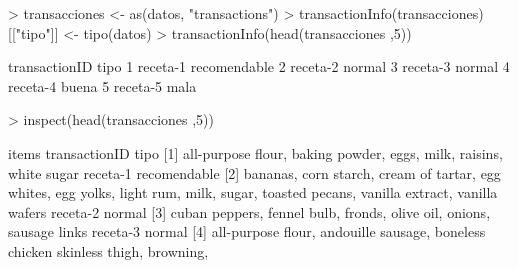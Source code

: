 \documentclass [a4paper] {article}
\begin{document}
\begin{Schunk}
\begin{Sinput}
> transacciones <- as(datos, "transactions")
> transactionInfo(transacciones)[["tipo"]] <- tipo(datos)
> transactionInfo(head(transacciones ,5))
\end{Sinput}
\begin{Soutput}
  transactionID         tipo
1      receta-1 recomendable
2      receta-2       normal
3      receta-3       normal
4      receta-4        buena
5      receta-5         mala
\end{Soutput}
\begin{Sinput}
> inspect(head(transacciones ,5))
\end{Sinput}
\begin{Soutput}
    items                             transactionID         tipo
[1] {all-purpose flour,                                         
     baking powder,                                             
     eggs,                                                      
     milk,                                                      
     raisins,                                                   
     white sugar}                          receta-1 recomendable
[2] {bananas,                                                   
     corn starch,                                               
     cream of tartar,                                           
     egg whites,                                                
     egg yolks,                                                 
     light rum,                                                 
     milk,                                                      
     sugar,                                                     
     toasted pecans,                                            
     vanilla extract,                                           
     vanilla wafers}                       receta-2 normal      
[3] {cuban peppers,                                             
     fennel bulb,                                               
     fronds,                                                    
     olive oil,                                                 
     onions,                                                    
     sausage links}                        receta-3 normal      
[4] {all-purpose flour,                                         
     andouille sausage,                                         
     boneless chicken skinless thigh,                           
     browning,                                                  
}
\end{Soutput}
\end{Schunk}
\end{document}
